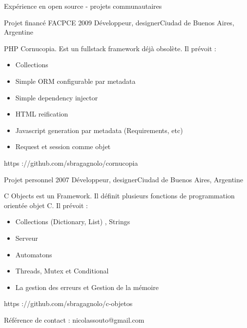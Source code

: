 \documentclass{resume} %
\begin{document}
\begin{rSection}{Exp\'{e}rience en open source - projets communautaires}
\begin{rSubsection}{Projet financ\'{e} FACPCE }{ 2009 }{D\'{e}veloppeur, designer}{Ciudad de Buenos Aires, Argentine}	
	\item PHP Cornucopia. Est un fullstack framework d\'{e}j\`{a} obsol\`{e}te. Il pr\'{e}voit :
	\begin{itemize}
		\item Collections
		\item Simple ORM configurable par metadata 
		\item Simple dependency injector
		\item HTML reification 
		\item Javascript generation par metadata (Requirements, etc)
		\item Request et session comme objet
	\end{itemize}
	\item https ://github.com/sbragagnolo/cornucopia
\end{rSubsection}
\begin{rSubsection}{Projet personnel}{ 2007 }{D\'{e}veloppeur, designer}{Ciudad de Buenos Aires, Argentine}
	\item C Objects est un Framework. Il d\'{e}finit plusieurs fonctions de programmation orient\'{e}e objet  C. Il pr\'{e}voit :
	\begin{itemize}
		\item Collections (Dictionary, List) , Strings
		\item Serveur
		\item Automatons
		\item Threads, Mutex et Conditional
		\item La gestion des erreurs et Gestion de la m\'{e}moire
	\end{itemize}
	\item https ://github.com/sbragagnolo/c-objetos
	\item R\'{e}f\'{e}rence de contact : nicolassouto@gmail.com
\end{rSubsection}
\end{rSection}

\end{document}
